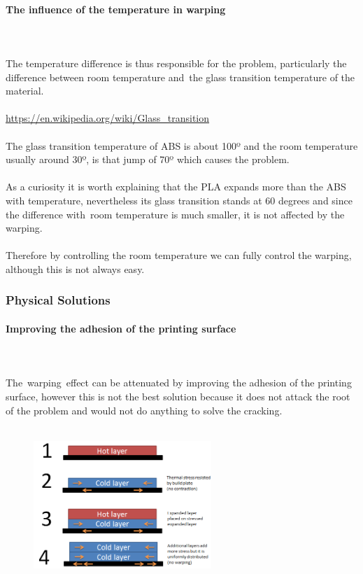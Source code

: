 \documentclass[11pt,a4paper]{article}
\begin{document}
			\paragraph{The influence of the temperature in warping}\mbox{}\\\\
The temperature difference is thus responsible for the problem, particularly the difference between room temperature and the glass transition temperature of the material.
\\\\
\url{https://en.wikipedia.org/wiki/Glass_transition}
\\\\
The glass transition temperature of ABS is about 100º and the room temperature usually around 30º, is that jump of 70º which causes the problem.
\\\\
As a curiosity it is worth explaining that the PLA expands more than the ABS with temperature, nevertheless its glass transition stands at 60 degrees and since the difference with room temperature is much smaller, it is not affected by the warping.
\\\\
Therefore by controlling the room temperature we can fully control the warping, although this is not always easy.
		\subsubsection{Physical Solutions}
			\paragraph{Improving the adhesion of the printing surface}\mbox{}\\\\
The warping effect can be attenuated by improving the adhesion of the printing surface, however this is not the best solution because it does not attack the root of the problem and would not do anything to solve the cracking.
\\\\
\begin{figure}[H]
\centering
\includegraphics[width=0.6\textwidth,cfbox=azul_marcos 4pt 0pt]{FOTOS/CAUSA_WARPING_2}
\end{figure}
\end{document}

